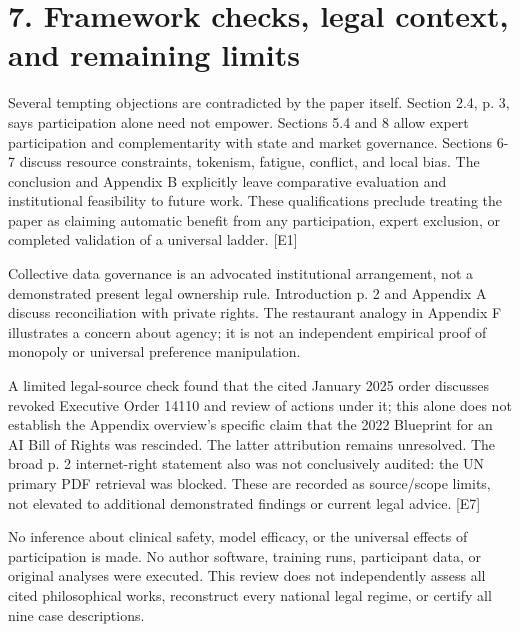\documentclass[10pt]{article}
\begin{document}
\section*{7. Framework checks, legal context, and remaining limits}
Several tempting objections are contradicted by the paper itself. Section 2.4, p. 3, says participation alone need not empower. Sections 5.4 and 8 allow expert participation and complementarity with state and market governance. Sections 6-7 discuss resource constraints, tokenism, fatigue, conflict, and local bias. The conclusion and Appendix B explicitly leave comparative evaluation and institutional feasibility to future work. These qualifications preclude treating the paper as claiming automatic benefit from any participation, expert exclusion, or completed validation of a universal ladder. [E1]\par
Collective data governance is an advocated institutional arrangement, not a demonstrated present legal ownership rule. Introduction p. 2 and Appendix A discuss reconciliation with private rights. The restaurant analogy in Appendix F illustrates a concern about agency; it is not an independent empirical proof of monopoly or universal preference manipulation.\par
A limited legal-source check found that the cited January 2025 order discusses revoked Executive Order 14110 and review of actions under it; this alone does not establish the Appendix overview’s specific claim that the 2022 Blueprint for an AI Bill of Rights was rescinded. The latter attribution remains unresolved. The broad p. 2 internet-right statement also was not conclusively audited: the UN primary PDF retrieval was blocked. These are recorded as source/scope limits, not elevated to additional demonstrated findings or current legal advice. [E7]\par
No inference about clinical safety, model efficacy, or the universal effects of participation is made. No author software, training runs, participant data, or original analyses were executed. This review does not independently assess all cited philosophical works, reconstruct every national legal regime, or certify all nine case descriptions.\par
\end{document}

